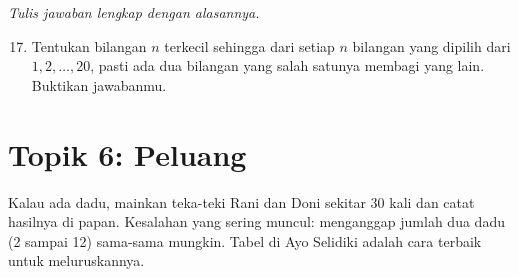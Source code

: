 \documentclass[11pt,a4paper]{article}
\begin{document}
\textit{Tulis jawaban lengkap dengan alasannya.}
\begin{enumerate}
  \setcounter{enumi}{16}
  \item Tentukan bilangan $n$ terkecil sehingga dari setiap $n$ bilangan yang dipilih dari
        $1, 2, \dots, 20$, pasti ada dua bilangan yang salah satunya membagi yang lain.
        Buktikan jawabanmu.
\end{enumerate}

\newpage
\section*{Topik 6: Peluang}

\begin{catatanguru}
Kalau ada dadu, mainkan teka-teki Rani dan Doni sekitar 30 kali dan catat hasilnya di papan.
Kesalahan yang sering muncul: menganggap jumlah dua dadu (2 sampai 12) sama-sama mungkin.
Tabel di Ayo Selidiki adalah cara terbaik untuk meluruskannya.
\end{catatanguru}
\end{document}
